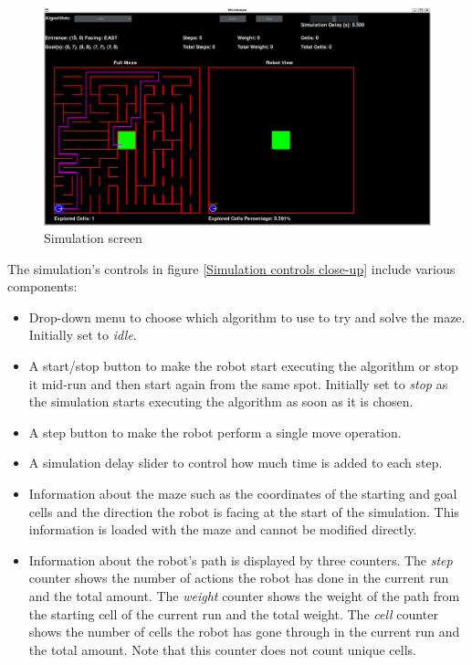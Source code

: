 \documentclass[12pt]{article}
\begin{document}
\begin{figure}[H]
\centering
\includegraphics[width=\textwidth]{images/simulation_start.png}
\caption{Simulation screen}
\label{Simulation screen}
\end{figure}

The simulation's controls in figure \ref{Simulation controls close-up} include various components:
\begin{itemize}
    \item Drop-down menu to choose which algorithm to use to try and solve the \gls{maze}. Initially set to \textit{idle}.
    \item A start/stop button to make the robot start executing the algorithm or stop it mid-run and then start again from the same spot.
    Initially set to \textit{stop} as the simulation starts executing the algorithm as soon as it is chosen.
    \item A step button to make the robot perform a single move operation.
    \item A simulation delay slider to control how much time is added to each step.
    \item Information about the \gls{maze} such as the coordinates of the starting and goal \gls{cell}s and the direction the robot is facing at the start of the simulation. This information is loaded with the \gls{maze} and cannot be modified directly.
    \item Information about the robot's path is displayed by three counters.
    The \textit{step} counter shows the number of actions the robot has done in the current run and the total amount.
    The \textit{weight} counter shows the weight of the path from the starting \gls{cell} of the current run and the total weight.
    The \textit{cell} counter shows the number of \gls{cell}s the robot has gone through in the current run and the total amount.
    Note that this counter does not count unique \gls{cell}s. 
\end{itemize}
\end{document}
